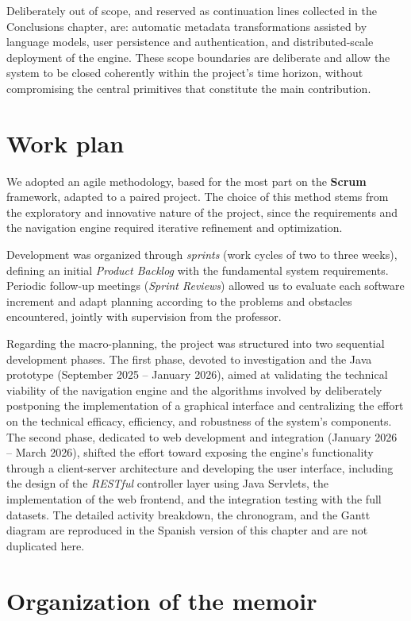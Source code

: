 Deliberately out of scope, and reserved as continuation lines collected in the Conclusions
chapter, are: automatic metadata transformations assisted by language models, user persistence
and authentication, and distributed-scale deployment of the engine. These scope boundaries are
deliberate and allow the system to be closed coherently within the project's time horizon,
without compromising the central primitives that constitute the main contribution.

\section*{Work plan}

We adopted an agile methodology, based for the most part on the \textbf{Scrum} framework,
adapted to a paired project. The choice of this method stems from the exploratory and
innovative nature of the project, since the requirements and the navigation engine required
iterative refinement and optimization.

Development was organized through \textit{sprints} (work cycles of two to three weeks),
defining an initial \textit{Product Backlog} with the fundamental system requirements. Periodic
follow-up meetings (\textit{Sprint Reviews}) allowed us to evaluate each software increment and
adapt planning according to the problems and obstacles encountered, jointly with supervision
from the professor.

Regarding the macro-planning, the project was structured into two sequential development
phases. The first phase, devoted to investigation and the Java prototype (September 2025 --
January 2026), aimed at validating the technical viability of the navigation engine and the
algorithms involved by deliberately postponing the implementation of a graphical interface and
centralizing the effort on the technical efficacy, efficiency, and robustness of the system's
components. The second phase, dedicated to web development and integration (January 2026 --
March 2026), shifted the effort toward exposing the engine's functionality through a
client-server architecture and developing the user interface, including the design of the
\textit{RESTful} controller layer using Java Servlets, the implementation of the web frontend,
and the integration testing with the full datasets. The detailed activity breakdown, the
chronogram, and the Gantt diagram are reproduced in the Spanish version of this chapter and
are not duplicated here.

\section*{Organization of the memoir}

